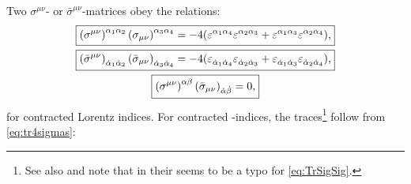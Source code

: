 Two $ \sigma^{\mu \nu} $- or $ \bar{\sigma}^{\mu \nu} $-matrices obey the relations:
\begin{gather}
	\begin{aligned}
		\boxed{
			\tensor{\left(\sigma^{\mu \nu}\right)}{^{\alpha_{1} \alpha_{2}}} \tensor{\left(\sigma_{\mu \nu}\right)}{^{\alpha_{3} \alpha_{4}}}
			= - 4 (\tensor{\eps}{^{\alpha_{1} \alpha_{4}}} \tensor{\eps}{^{\alpha_{2} \alpha_{3}}} + \tensor{\eps}{^{\alpha_{1} \alpha_{3}}} \tensor{\eps}{^{\alpha_{2} \alpha_{4}}})
			\text{,}
		}
		\\
		\boxed{
			\tensor{\left(\bar{\sigma}^{\mu \nu}\right)}{_{\dot{\alpha}_{1} \dot{\alpha}_{2}}} \tensor{\left(\bar{\sigma}_{\mu \nu}\right)}{_{\dot{\alpha}_{3} \dot{\alpha}_{4}}}
			= - 4 (\tensor{\eps}{_{\dot{\alpha}_{1} \dot{\alpha}_{4}}} \tensor{\eps}{_{\dot{\alpha}_{2} \dot{\alpha}_{3}}} + \tensor{\eps}{_{\dot{\alpha}_{1} \dot{\alpha}_{3}}} \tensor{\eps}{_{\dot{\alpha}_{2} \dot{\alpha}_{4}}})
			\text{,}
		}
	\end{aligned} \label{eq:sigmamunuRelation}\\
	\begin{aligned}
		\boxed{
			\tensor{\left(\sigma^{\mu \nu}\right)}{^{\alpha \beta}}
			\tensor{\left(\bar{\sigma}_{\mu \nu}\right)}{_{\dot{\alpha} \dot{\beta}}}
			= 0
			\text{,}
		}
	\end{aligned} \label{eq:sigmamunusigmabarmunuRelation}
\end{gather}
for contracted Lorentz indices. For contracted \SLtwoC{}-indices, the traces\footnote{See also  and note that in  their seems to be a typo for \cref{eq:TrSigSig}.} follow from \cref{eq:tr4sigmas}:
